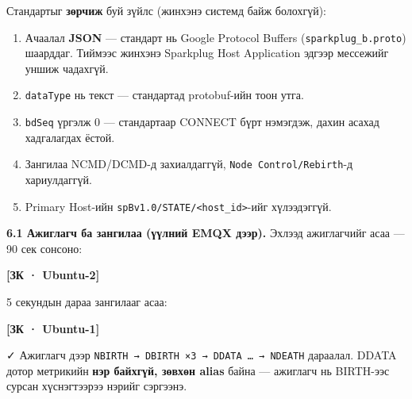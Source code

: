 Стандартыг \textbf{зөрчиж} буй зүйлс (жинхэнэ системд байж болохгүй):

\begin{enumerate}
\def\labelenumi{\arabic{enumi}.}
\tightlist
\item
  Ачаалал \textbf{JSON} --- стандарт нь Google Protocol Buffers (\texttt{sparkplug\_\allowbreak{}b.\allowbreak{}proto}) шаарддаг. Тиймээс жинхэнэ Sparkplug Host Application эдгээр мессежийг уншиж чадахгүй.
\item
  \texttt{dataType} нь текст --- стандартад protobuf-ийн тоон утга.
\item
  \texttt{bdSeq} үргэлж 0 --- стандартаар CONNECT бүрт нэмэгдэж, дахин асахад хадгалагдах ёстой.
\item
  Зангилаа NCMD/DCMD-д захиалдаггүй, \texttt{Node\ Control/\allowbreak{}Rebirth}-д хариулдаггүй.
\item
  Primary Host-ийн \texttt{spBv1.\allowbreak{}0/\allowbreak{}STATE/\allowbreak{}\textless{}host\_\allowbreak{}id\textgreater{}}-ийг хүлээдэггүй.
\end{enumerate}

\textbf{6.1 Ажиглагч ба зангилаа (үүлний EMQX дээр).} Эхлээд ажиглагчийг асаа --- 90 сек сонсоно:

\textbf{{[}ЗК · Ubuntu-2{]}}

\begin{Shaded}
\begin{Highlighting}[]
\KeywordTok{|} 
\end{Highlighting}
\end{Shaded}

5 секундын дараа зангилааг асаа:

\textbf{{[}ЗК · Ubuntu-1{]}}

\begin{Shaded}
\begin{Highlighting}[]
\end{Highlighting}
\end{Shaded}

✓ Ажиглагч дээр \texttt{NBIRTH\ →\ DBIRTH\ ×3\ →\ DDATA\ \ldots{}\ →\ NDEATH} дараалал. DDATA дотор метрикийн \textbf{нэр байхгүй, зөвхөн alias} байна --- ажиглагч нь BIRTH-ээс сурсан хүснэгтээрээ нэрийг сэргээнэ.

